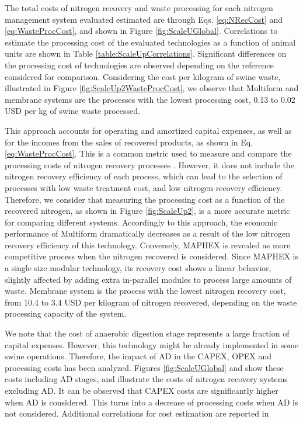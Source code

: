 \begin{refsection}[referencesCh6]
The total costs of nitrogen recovery and waste processing for each nitrogen management system evaluated estimated are through Eqs. \ref{eq:NRecCost} and \ref{eq:WasteProcCost}, and shown in Figure \ref{fig:ScaleUGlobal}.
Correlations to estimate the processing cost of the evaluated technologies as a function of animal units are shown in Table \ref{table:ScaleUpCorrelations}. Significant differences on the processing cost of technologies are observed depending on the reference considered for comparison. Considering the cost per kilogram of swine waste, illustrated in Figure \ref{fig:ScaleUp2WasteProcCost}, we observe that Multiform and membrane systems are the processes with the lowest processing cost, 0.13 to 0.02 USD per kg of swine waste processed. 

This approach accounts for operating and amortized capital expenses, as well as for the incomes from the sales of recovered products, as shown in Eq. \ref{eq:WasteProcCost}.
This is a common metric used to measure and compare the processing costs of nitrogen recovery processes \citep{de2019resource, bolzonella2018nutrients}.
However, it does not include the nitrogen recovery efficiency of each process, which can lead to the selection of processes with low waste treatment cost, and low nitrogen recovery efficiency. Therefore, we consider that measuring the processing cost as a function of the recovered nitrogen, as shown in Figure \ref{fig:ScaleUp2}, is a more accurate metric for comparing different systems. Accordingly to this approach, the economic performance of Multiform dramatically decreases as a result of the low nitrogen recovery efficiency of this technology. Conversely, MAPHEX is revealed as more competitive process when the nitrogen recovered is considered. Since MAPHEX is a single size modular technology, its recovery cost shows a linear behavior, slightly affected by adding extra in-parallel modules to process large amounts of waste. Membrane system is the process with the lowest nitrogen recovery cost, from 10.4 to 3.4 USD per kilogram of nitrogen recovered, depending on the waste processing capacity of the system.

We note that the cost of anaerobic digestion stage represents a large fraction of capital expenses. However, this technology might be already implemented in some swine operations. Therefore, the impact of AD in the CAPEX, OPEX and processing costs has been analyzed. Figures \ref{fig:ScaleUGlobal} and {\color{blue}{1S}} show these costs including AD stages, and {\color{blue}{Figures 2S and 3S}} illustrate the costs of nitrogen recovery systems excluding AD. It can be observed that CAPEX costs are significantly higher when AD is considered. This turns into a decrease of processing costs when AD is not considered. Additional correlations for cost estimation
are reported in {\color{blue}{Table 1S.}}


\end{refsection}
